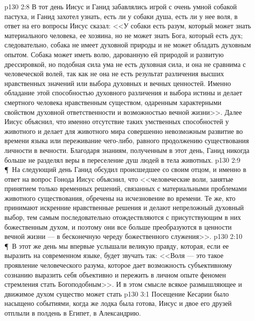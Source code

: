 \vs p130 2:8 В тот день Иисус и Ганид забавлялись игрой с очень умной собакой пастуха, и Ганид захотел узнать, есть ли у собаки душа, есть ли у нее воля, в ответ на его вопросы Иисус сказал: <<У собаки есть разум, который может знать материального человека, ее хозяина, но не может знать Бога, который есть дух; следовательно, собака не имеет духовной природы и не может обладать духовным опытом. Собака может иметь волю, дарованную ей природой и развитую дрессировкой, но подобная сила ума не есть духовная сила, и она не сравнима с человеческой волей, так как не  она не есть результат различения высших нравственных значений или выбора духовных и вечных ценностей. Именно обладание этой способностью духовного различения и выбора истины и делает смертного человека нравственным существом, одаренным характерными свойством духовной ответственности и возможностью вечной жизни>>. Далее Иисус объяснил, что именно отсутствие таких умственных способностей у животного и делает для животного мира совершенно невозможным развитие во времени языка или переживание чего\hyp{}либо, равного продолжению существования личности в вечности. Благодаря знаниям, полученным в этот день, Ганид никогда больше не разделял веры в переселение душ людей в тела животных.
\vs p130 2:9 \P\ На следующий день Ганид обсудил происшедшее со своим отцом, и именно в ответ на вопрос Гонода Иисус объяснил, что <<человеческие воли, занятые принятием только временных решений, связанных с материальными проблемами животного существования, обречены на исчезновение во времени. Те же, кто принимают искренние нравственные решения и делают непреложный духовный выбор, тем самым последовательно отождествляются с присутствующим в них божественным духом, и поэтому они все больше преобразуются в ценности вечной жизни --- в бесконечную череду божественного служения>>.
\vs p130 2:10 \P\ В этот же день мы впервые услышали великую правду, которая, если ее выразить на современном языке, будет звучать так: <<Воля --- это такое проявление человеческого разума, которое дает возможность субъективному сознанию выразить себя объективно и пережить в личном опыте феномен стремления стать Богоподобным>>. И в этом смысле всякое размышляющее и движимое духом существо может стать 
\vs p130 3:1 Посещение Кесарии было насыщено событиями, когда же лодка была готова, Иисус и двое его друзей отплыли в полдень в Египет, в Александрию.
